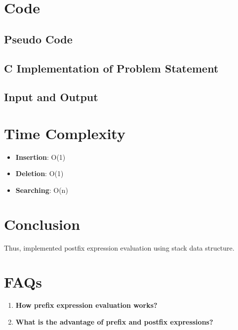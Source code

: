 \documentclass[11pt]{article}
\begin{document}
\section{Code}
\subsection{Pseudo Code}
\subsection{C Implementation of Problem Statement}



\subsection{Input and Output}


\section{Time Complexity}
\begin{itemize}
	\item \textbf{Insertion}: O(1)
	\item \textbf{Deletion}: O(1)
	\item \textbf{Searching}: O(n)
\end{itemize}

\section{Conclusion}
Thus, implemented postfix expression evaluation using stack data structure.


\section{FAQs}
\begin{enumerate}
	\item \textbf{How prefix expression evaluation works?}\\
	
	
	\item \textbf{What is the advantage of prefix and postfix expressions?}\\
	
\end{enumerate}
\end{document}
